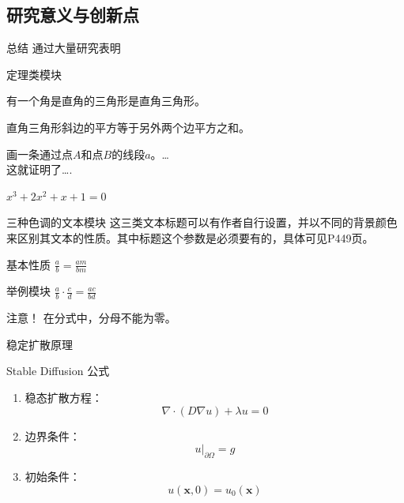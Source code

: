 \documentclass[14pt,hyperref={CJKbookmarks=true}]{beamer} %
\begin{document}
	\subsection{研究意义与创新点}
	\begin{frame}{总结}
		通过大量研究表明
	\end{frame}
	\begin{frame}{定理类模块}
		\begin{DEfinition}
			有一个角是直角的三角形是直角三角形。
		\end{DEfinition}
		\begin{THeorem}
			直角三角形斜边的平方等于另外两个边平方之和。
		\end{THeorem}
		\begin{PRoof}
			画一条通过点$A$和点$B$的线段$a$。\dots \\
			这就证明了\dots.    %
		\end{PRoof}
		\begin{EXample}
			$x^{3}+2x^{2}+x+1=0$
		\end{EXample}
	\end{frame}
	\begin{frame}{三种色调的文本模块}
		这三类文本标题可以有作者自行设置，并以不同的背景颜色来区别其文本的性质。其中标题这个参数是必须要有的，具体可见P449页。
		\begin{block}{基本性质}
			$\frac{a}{b}=\frac{am}{bm}$
		\end{block}
		\begin{exampleblock}{举例模块}
			$\frac{a}{b}\cdot\frac{c}{d}=\frac{ac}{bd}$
		\end{exampleblock}
		\begin{alertblock}{\heiti 注意！}
			在分式中，分母不能为零。
		\end{alertblock}
	\end{frame}
	\begin{frame}{稳定扩散原理}
		\begin{block}{Stable Diffusion 公式}
			\begin{enumerate}
				\item 稳态扩散方程：
				\[
				\nabla \cdot (D \nabla u) + \lambda u = 0
				\]
	
				\item 边界条件：
				\[
				u|_{\partial\Omega} = g
				\]
	
				\item 初始条件：
				\[
				u(\mathbf{x}, 0) = u_0(\mathbf{x})
				\]
			\end{enumerate}
		\end{block}
	\end{frame}
\end{document}
